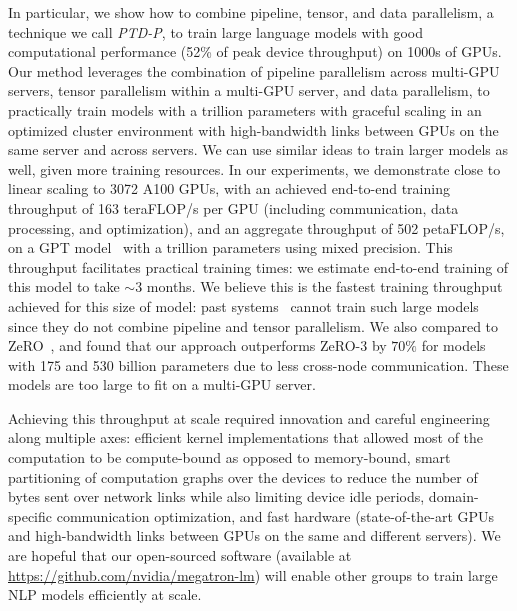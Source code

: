 In particular, we show how to combine pipeline, tensor, and data parallelism, a technique we call \emph{PTD-P}, to train large language models with good computational performance (52\% of peak device throughput) on 1000s of GPUs. Our method leverages the combination of pipeline parallelism across multi-GPU servers, tensor parallelism within a multi-GPU server, and data parallelism, to practically train models with a trillion parameters with graceful scaling in an optimized cluster environment with high-bandwidth links between GPUs on the same server and across servers. We can use similar ideas to train larger models as well, given more training resources. In our experiments, we demonstrate close to linear scaling to 3072 A100 GPUs, with an achieved end-to-end training throughput of 163 teraFLOP/s per GPU (including communication, data processing, and optimization), and an aggregate throughput of 502 petaFLOP/s, on a GPT model~\cite{gpt3} with a trillion parameters using mixed precision. This throughput facilitates practical training times: we estimate end-to-end training of this model to take $\sim 3$ months. We believe this is the fastest training throughput achieved for this size of model: past systems~\cite{shoeybi2019megatron, narayanan2019pipedream} cannot train such large models since they do not combine pipeline and tensor parallelism. We also compared to ZeRO~\cite{rajbhandari2019zero}, and found that our approach outperforms ZeRO-3 by $70\%$ for models with 175 and 530 billion parameters due to less cross-node communication. These models are too large to fit on a multi-GPU server.

Achieving this throughput at scale required innovation and careful engineering along multiple axes: efficient kernel implementations that allowed most of the computation to be compute-bound as opposed to memory-bound, smart partitioning of computation graphs over the devices to reduce the number of bytes sent over network links while also limiting device idle periods, domain-specific communication optimization, and fast hardware (state-of-the-art GPUs and high-bandwidth links between GPUs on the same and different servers). We are hopeful that our open-sourced software (available at \url{https://github.com/nvidia/megatron-lm}) will enable other groups to train large NLP models efficiently at scale. 

